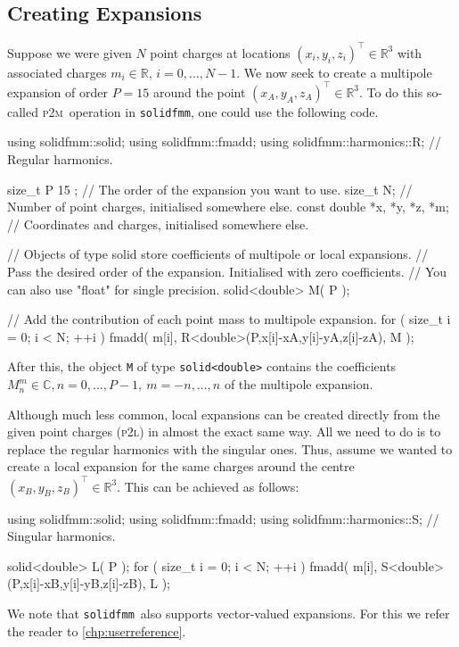 \documentclass{scrbook}
\newcommand{\solidfmm}{\texttt{solidfmm}}
\newcommand{\PtoM}{\textsc{p2m}}
\newcommand{\PtoL}{\textsc{p2l}}
\newcommand{\reals}{\ensuremath{\mathbb{R}}}
\newcommand{\complex}{\mathbb{C}}
\newcommand{\wholespace}{\ensuremath{\reals^3}}
\begin{document}
\subsection{Creating Expansions}
Suppose we were given $N$ point charges at locations $(x_i,y_i,z_i)^\top
\in\wholespace$ with associated charges $m_i\in\reals$, $i=0,\dotsc,N-1$. We
now seek to create a multipole expansion of order $P=\text{15}$ around the point
$(x_A,y_A,z_A)^\top\in\wholespace$. To do this so-called \PtoM\ operation in
\solidfmm, one could use the following code.
\begin{cppcode*}
using solidfmm::solid;
using solidfmm::fmadd;
using solidfmm::harmonics::R; // Regular harmonics.

size_t P { 15 };             // The order of the expansion you want to use.
size_t N;                    // Number of point charges, initialised somewhere else.
const double *x, *y, *z, *m; // Coordinates and charges, initialised somewhere else.

// Objects of type solid store coefficients of multipole or local expansions.
// Pass the desired order of the expansion. Initialised with zero coefficients.
// You can also use "float" for single precision.
solid<double> M( P ); 

// Add the contribution of each point mass to multipole expansion.
for ( size_t i = 0; i < N; ++i )
    fmadd( m[i], R<double>(P,x[i]-xA,y[i]-yA,z[i]-zA), M );
\end{cppcode*}

After this, the object \lstinline|M| of type \lstinline|solid<double>| contains
the coefficients $M_n^m\in\complex, n=0,\dotsc,P-1,\ m=-n,\dotsc,n$ of the
multipole expansion.

Although much less common, local expansions can be created directly from the
given point charges (\PtoL) in almost the exact same way. All we need to
do is to replace the regular harmonics with the singular ones. Thus, assume we
wanted to create a local expansion for the same charges around the centre
$(x_B,y_B,z_B)^\top\in\wholespace$. This can be achieved as follows:
\begin{cppcode*}
using solidfmm::solid;
using solidfmm::fmadd;
using solidfmm::harmonics::S; // Singular harmonics.

solid<double> L( P ); 
for ( size_t i = 0; i < N; ++i )
    fmadd( m[i], S<double>(P,x[i]-xB,y[i]-yB,z[i]-zB), L );
\end{cppcode*}

We note that \solidfmm\ also supports vector-valued expansions. For this we
refer the reader to \cref{chp:userreference}.
\end{document}
